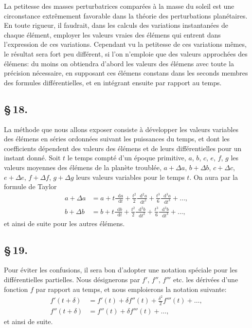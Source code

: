 \documentclass[12pt,a4paper]{article}
\newcommand{\dd}{\mathop{}\!\mathrm{d}}
\begin{document}
La petitesse des masses perturbatrices compar\'{e}es \`{a} la masse du soleil est une circonstance extr\^{e}mement favorable dans la th\'{e}orie des perturbations plan\'{e}taires. En toute rigueur, il faudrait, dans les calculs des variations instantan\'{e}es de chaque \'{e}l\'{e}ment, employer les valeurs vraies des \'{e}l\'{e}mens qui entrent dans l'expression de ces variations. Cependant vu la petitesse de ces variations m\^{e}mes, le r\'{e}sultat sera fort peu diff\'{e}rent, si l'on n'emploie que des valeurs approch\'{e}es des \'{e}l\'{e}mens: du moins on obtiendra d'abord les valeurs des \'{e}l\'{e}mens avec toute la pr\'{e}cision n\'{e}cessaire, en supposant ces \'{e}l\'{e}mens constans dans les seconds membres des formules diff\'{e}rentielles, et en int\'{e}grant ensuite par rapport au temps.

\newpage
\subsection*{\S\,18.}

La m\'{e}thode que nous allons exposer consiste \`{a} d\'{e}velopper les valeurs variables des \'{e}l\'{e}mens en s\'{e}ries ordonn\'{e}es suivant les puissances du temps, et dont les coefficients d\'{e}pendent des valeurs des \'{e}l\'{e}mens et de leurs diff\'{e}rentielles pour un instant donn\'{e}. Soit $t$ le temps compt\'{e} d'un \'{e}poque primitive, $a$, $b$, $c$, $e$, $f$, $g$ les valeurs moyennes des \'{e}l\'{e}mens de la plan\`{e}te troubl\'{e}e, $a + \Delta a$, $b + \Delta b$, $c + \Delta c$, $e + \Delta e$, $f + \Delta f$, $g + \Delta g$ leurs valeurs variables pour le temps $t$. On aura par la formule de Taylor
\begin{align}
a + \Delta a &= a + t\frac{\dd a}{\dd t} + \frac{t^2}{2}\frac{\dd^2 a}{\dd t^2} + \frac{t^3}{6}\frac{\dd^3 a}{\dd t^3} + \ldots, \tag{93} \\
b + \Delta b &= b + t\frac{\dd b}{\dd t} + \frac{t^2}{2}\frac{\dd^2 b}{\dd t^2} + \frac{t^3}{6}\frac{\dd^3 b}{\dd t^3} + \ldots, \tag{94}
\end{align}
et ainsi de suite pour les autres \'{e}l\'{e}mens.

\newpage
\subsection*{\S\,19.}

Pour \'{e}viter les confusions, il sera bon d'adopter une notation sp\'{e}ciale pour les diff\'{e}rentielles partielles. Nous d\'{e}signerons par $f'$, $f''$, $f'''$ etc. les d\'{e}riv\'{e}es d'une fonction $f$ par rapport au temps, et nous emploierons la notation suivante:
\begin{align}
f'(t + \delta) &= f'(t) + \delta f''(t) + \frac{\delta^2}{2}f'''(t) + \ldots, \tag{95} \\
f''(t + \delta) &= f''(t) + \delta f'''(t) + \ldots, \tag{96}
\end{align}
et ainsi de suite.
\end{document}
